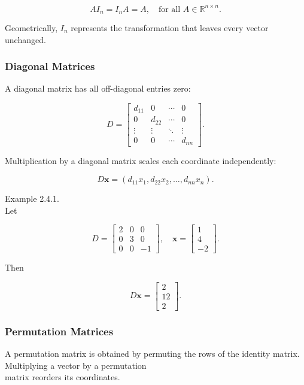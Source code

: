 \documentclass[
  12pt,
  a4paper,
]{article}
\begin{document}
\[AI_n = I_nA = A, \quad \text{for all } A \in \mathbb{R}^{n \times n}.\]

Geometrically, \(I_n\) represents the transformation that leaves every
vector unchanged.

\subsubsection{Diagonal Matrices}\label{diagonal-matrices}

A diagonal matrix has all off-diagonal entries zero:

\[D = \begin{bmatrix}
d_{11} & 0 & \cdots & 0 \\
0 & d_{22} & \cdots & 0 \\
\vdots & \vdots & \ddots & \vdots \\
0 & 0 & \cdots & d_{nn}
\end{bmatrix}.\]

Multiplication by a diagonal matrix scales each coordinate
independently:

\[D\mathbf{x} = (d_{11}x_1, d_{22}x_2, \dots, d_{nn}x_n).\]

Example 2.4.1.\\
Let

\[D = \begin{bmatrix} 2 & 0 & 0 \\
0 & 3 & 0 \\
0 & 0 & -1 \end{bmatrix}, \quad
\mathbf{x} = \begin{bmatrix}
1 \\
4 \\
-2 \end{bmatrix}.\]

Then

\[D\mathbf{x} = \begin{bmatrix}
2 \\
12 \\
2 \end{bmatrix}.\]

\subsubsection{Permutation Matrices}\label{permutation-matrices}

A permutation matrix is obtained by permuting the rows of the identity
matrix. Multiplying a vector by a permutation\\
matrix reorders its coordinates.
\end{document}
